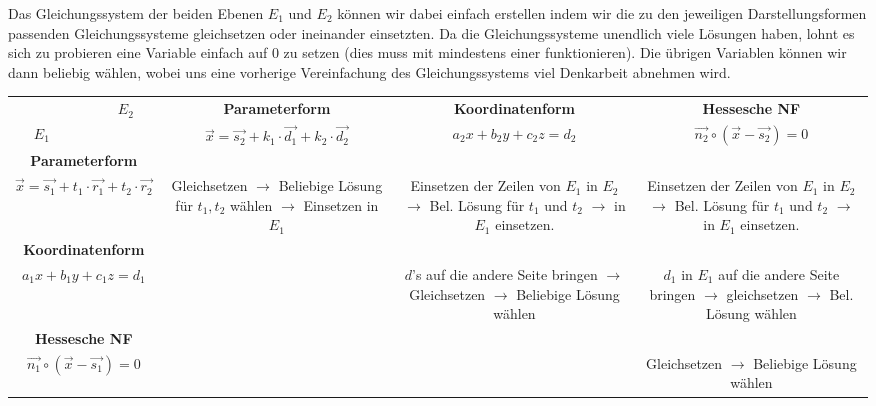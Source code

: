\documentclass[a4paper,12pt]{article}
\begin{document}
	Das Gleichungssystem der beiden Ebenen $E_1$ und  $E_2$ können wir dabei einfach erstellen
	indem wir die zu den jeweiligen Darstellungsformen passenden Gleichungssysteme gleichsetzen oder ineinander
	einsetzten. Da die Gleichungssysteme unendlich viele Lösungen haben, lohnt es sich zu probieren eine Variable
	einfach auf $0$ zu setzen (dies muss mit mindestens einer funktionieren). Die übrigen Variablen 
	können wir dann beliebig wählen, wobei uns eine vorherige Vereinfachung des Gleichungssystems viel 
	Denkarbeit abnehmen wird.\vspace*{2cm}
		
	\begin{sidewaystable}
		\begin{tabular}{|c|c|c|c|}
			\hline 
			$ \qquad\qquad\qquad E_2$
			&\textbf{Parameterform}&\textbf{Koordinatenform}&\textbf{Hessesche NF}\\
			$E_1\qquad\qquad\qquad$&$\vec{x}= \vec{s_2}+ k_1 \cdot \vec{d_1} + k_2 \cdot \vec{d_2}$&
		$a_2x+b_2y+c_2z=d_2$	&$\vec{n_2} \circ \left( \vec{x} - \vec{s_2} \right) = 0 $\\\hline
			\textbf{Parameterform}&&&\\
			$\vec{x}= \vec{s_1}+ t_1 \cdot \vec{r_1} + t_2 \cdot \vec{r_2}$&\parbox{5cm}{Gleichsetzen $\rightarrow$ Beliebige Lösung für $t_1,t_2$ wählen $\rightarrow$ Einsetzen in  $E_1$\\}& 
			\parbox{5cm}{Einsetzen der Zeilen
			von $E_1$ in $E_2$ $\rightarrow$ Bel. Lösung für $t_1$ und $t_2$ $\rightarrow$ in $E_1$ einsetzen.\\ }
			&\parbox{5cm}{Einsetzen der Zeilen
			von $E_1$ in $E_2$ $\rightarrow$ Bel. Lösung für $t_1$ und $t_2$ $\rightarrow$ in  $E_1$ einsetzen.\\ } \\\hline
			\textbf{Koordinatenform}&&& \\
			$a_1x+b_1y+c_1z=d_1$&&\parbox{5cm}{$d$'s auf die andere
			Seite bringen $\rightarrow$ Gleichsetzen $\rightarrow$ Beliebige Lösung wählen\\}
			&\parbox{5cm}{$d_1$ in  $E_1$ auf die andere Seite bringen  $\rightarrow$ 
			gleichsetzen  $\rightarrow$ Bel. Lösung wählen\\}\\\hline
			\textbf{Hessesche NF}&&&\\
			$\vec{n_1} \circ \left( \vec{x} - \vec{s_1} \right) = 0 $&&&\parbox{5cm}{Gleichsetzen $\rightarrow$ Beliebige Lösung wählen\\}\\\hline
		\end{tabular}
	\end{sidewaystable}
\end{document}
